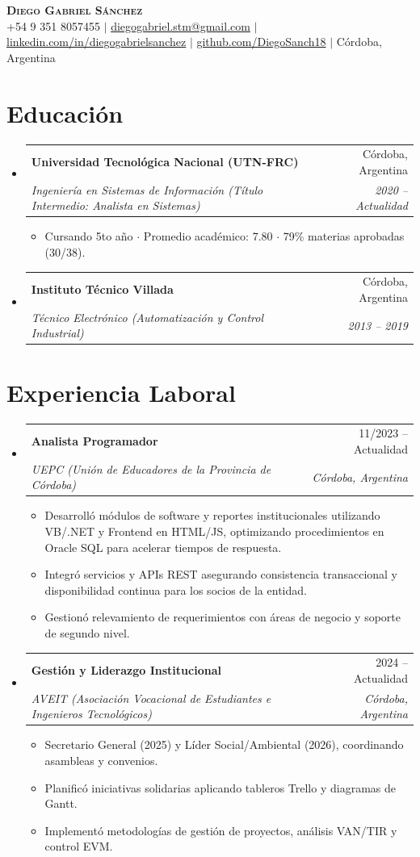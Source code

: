 \documentclass[letterpaper,10.5pt]{article}
\makeatletter
\newcommand{\resumeItem}[1]{
  \item\small{
    {#1 \vspace{-2pt}}
  }
}
\newcommand{\resumeSubheading}[4]{
  \vspace{-2pt}\item
    \begin{tabular*}{0.97\textwidth}[t]{l@{\extracolsep{\fill}}r}
      \textbf{#1} & #2 \\
      \textit{\small#3} & \textit{\small #4} \\
    \end{tabular*}\vspace{-7pt}
}
\newcommand{\resumeSubHeadingListStart}{\begin{itemize}[leftmargin=0.15in, label={}]}
\newcommand{\resumeSubHeadingListEnd}{\end{itemize}}
\newcommand{\resumeItemListStart}{\begin{itemize}[leftmargin=0.2in, label={\tiny$\bullet$}]}
\newcommand{\resumeItemListEnd}{\end{itemize}\vspace{-5pt}}
\makeatother
\begin{document}
\begin{center}
    \textbf{\Huge \scshape Diego Gabriel Sánchez} \\ \vspace{2pt}
    \small +54 9 351 8057455 $|$ \href{mailto:diegogabriel.stm@gmail.com}{diegogabriel.stm@gmail.com} $|$ 
    \href{https://linkedin.com/in/diegogabrielsanchez}{linkedin.com/in/diegogabrielsanchez} $|$
    \href{https://github.com/DiegoSanch18}{github.com/DiegoSanch18} $|$ Córdoba, Argentina
\end{center}

\section{Educación}
  \resumeSubHeadingListStart
    \resumeSubheading
      {Universidad Tecnológica Nacional (UTN-FRC)}{Córdoba, Argentina}
      {Ingeniería en Sistemas de Información (Título Intermedio: Analista en Sistemas)}{2020 -- Actualidad}
      \resumeItemListStart
        \resumeItem{Cursando 5to año $\cdot$ Promedio académico: 7.80 $\cdot$ 79\% materias aprobadas (30/38).}
      \resumeItemListEnd
    \resumeSubheading
      {Instituto Técnico Villada}{Córdoba, Argentina}
      {Técnico Electrónico (Automatización y Control Industrial)}{2013 -- 2019}
  \resumeSubHeadingListEnd

\section{Experiencia Laboral}
  \resumeSubHeadingListStart
    \resumeSubheading
      {Analista Programador}{11/2023 -- Actualidad}
      {UEPC (Unión de Educadores de la Provincia de Córdoba)}{Córdoba, Argentina}
      \resumeItemListStart
        \resumeItem{Desarrolló módulos de software y reportes institucionales utilizando VB/.NET y Frontend en HTML/JS, optimizando procedimientos en Oracle SQL para acelerar tiempos de respuesta.}
        \resumeItem{Integró servicios y APIs REST asegurando consistencia transaccional y disponibilidad continua para los socios de la entidad.}
        \resumeItem{Gestionó relevamiento de requerimientos con áreas de negocio y soporte de segundo nivel.}
      \resumeItemListEnd

    \resumeSubheading
      {Gestión y Liderazgo Institucional}{2024 -- Actualidad}
      {AVEIT (Asociación Vocacional de Estudiantes e Ingenieros Tecnológicos)}{Córdoba, Argentina}
      \resumeItemListStart
        \resumeItem{Secretario General (2025) y Líder Social/Ambiental (2026), coordinando asambleas y convenios.}
        \resumeItem{Planificó iniciativas solidarias aplicando tableros Trello y diagramas de Gantt.}
        \resumeItem{Implementó metodologías de gestión de proyectos, análisis VAN/TIR y control EVM.}
      \resumeItemListEnd
  \resumeSubHeadingListEnd
\end{document}
